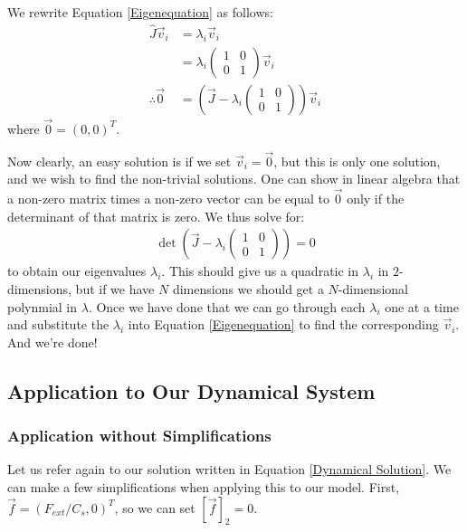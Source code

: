 We rewrite Equation \ref{Eigenequation} as follows:
\begin{align*}
    \hat{J}\vec{v}_i&=\lambda_i\vec{v}_i\\
    &=\lambda_i\left( \begin{array}{cc}
        1 & 0 \\
        0 & 1
    \end{array} \right)\vec{v}_i\\
    \therefore \vec{0} & = \left( 
        \vec{J} - \lambda_i \left( \begin{array}{cc}
        1 & 0 \\
        0 & 1
    \end{array} \right)
    \right)\vec{v}_i
\end{align*}
where $\vec{0}=(0,0)^T$. 

Now clearly, an easy solution is if we set $\vec{v}_i=\vec{0}$, but this is only one solution, and we wish to find the non-trivial solutions. One can show in linear algebra that a non-zero matrix times a non-zero vector can be equal to $\vec{0}$ only if the determinant of that matrix is zero. We thus solve for:
\begin{align*}
    \det\left( 
        \vec{J} - \lambda_i \left( \begin{array}{cc}
        1 & 0 \\
        0 & 1
    \end{array} \right)
    \right)=0
\end{align*}
to obtain our eigenvalues $\lambda_i$. This should give us a quadratic in $\lambda_i$ in $2$-dimensions, but if we have $N$ dimensions we should get a $N$-dimensional polynmial in $\lambda$. Once we have done that we can go through each $\lambda_i$ one at a time and substitute the $\lambda_i$ into Equation \ref{Eigenequation} to find the corresponding $\vec{v}_i$. And we're done!

\subsection{Application to Our Dynamical System}\label{App to Dym}

\subsubsection{Application without Simplifications}

Let us refer again to our solution written in Equation \ref{Dynamical Solution}. We can make a few simplifications when applying this to our model. First, $\vec{f}=(F_{ext}/C_s,0)^T$, so we can set $[\vec{f}]_2=0$. 

